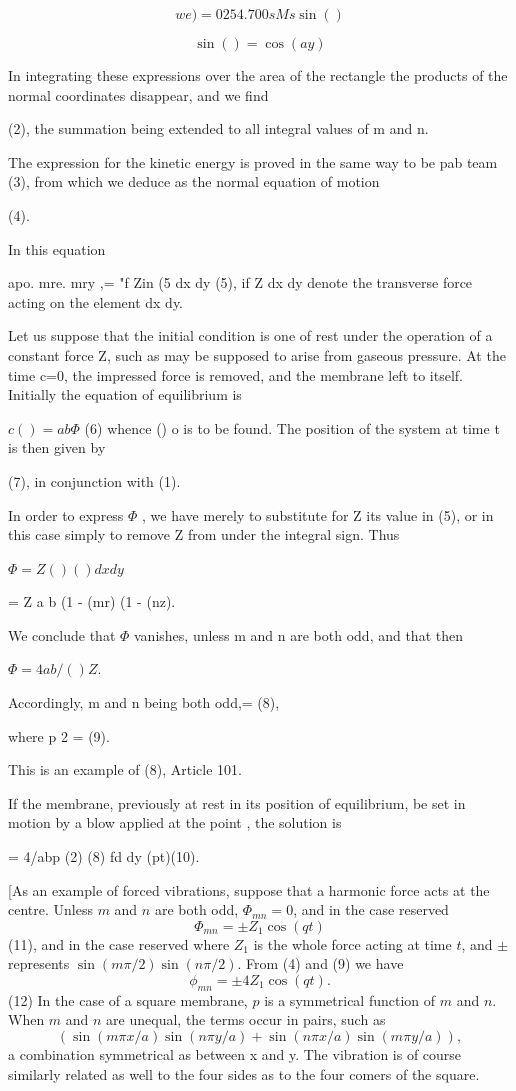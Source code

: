 \[we) = 0 254.7 00s Ms \sin()\]

\[\sin()= \cos(ay)\]

In integrating these expressions over the area of the rectangle the
products of the normal coordinates disappear, and we find

(2),
the summation being extended to all integral values of m and n.

The expression for the kinetic energy is proved in the same way to be
pab
team (3), from which we deduce as the normal equation of motion

(4).

In this equation

apo. mre. mry ,= "f Zin (5 dx dy (5),
if Z dx dy denote the transverse force acting on the element dx dy.

Let us suppose that the initial condition is one of rest under the
operation of a constant force Z, such as may be supposed to arise from
gaseous pressure. At the time c=0, the impressed force is removed, and
the membrane left to itself. Initially the equation of equilibrium is

\(c () = ab \Phi\) (6)
whence () o is to be found. The position of the system at time t is then
given by

(7),
in conjunction with (1).

In order to express \(\Phi\) , we have merely to substitute for Z its value
in (5), or in this case simply to remove Z from under the integral sign.
Thus

\(\Phi = Z () () dx dy\)

= Z a b (1 - (mr) (1 - (nz).

We conclude that \(\Phi\) vanishes, unless m and n are both odd, and that
then

\(\Phi = 4ab/() Z.\)

Accordingly, m and n being both odd,= (8),

where p 2 = (9).

This is an example of (8), Article 101.

If the membrane, previously at rest in its position of equilibrium, be
set in motion by a blow applied at the point , the solution is

= 4/abp (2) (8) fd dy (pt)(10).

[As an example of forced vibrations, suppose that a harmonic
force acts at the centre. Unless \(m\) and \(n\) are both odd,
\( \Phi_{mn} = 0\), and in the case reserved
\[ \Phi_{mn} = \pm Z_1 \cos (qt) \]
(11), and in the case reserved
where
\( Z_1\)
is the whole force acting at time \(t\), and
\(\pm\) represents
\( \sin (m \pi/2) \sin (n \pi/2)\). From (4) and (9) we have
\[ \phi_{mn} = \pm 4 Z_1 \cos (qt).  \]
(12) In the case of a square membrane, \(p\) is a symmetrical function
of \(m\) and \(n\).  When \(m\) and \(n\) are unequal, the terms occur in pairs,
such as
\[ \left( \sin (m \pi x/a) \sin (n \pi y/a) + \sin (n \pi x/a) \sin (m \pi y/a) \right),\]
a combination symmetrical as between x and y. The vibration is
of course similarly related as well to the four sides as to the four
comers of the square.

